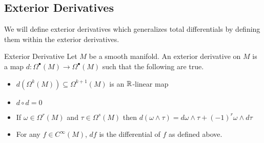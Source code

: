 \documentclass[a4paper]{article}
\begin{document}
\subsection{Exterior Derivatives}
We will define exterior derivatives which generalizes total differentials by defining them within the exterior derivatives. 

\begin{defn}{Exterior Derivative}{} Let $M$ be a smooth manifold. An exterior derivative on $M$ is a map $d:\Omega^\bullet(M)\to\Omega^\bullet(M)$ such that the following are true. 
\begin{itemize}
\item $d(\Omega^k(M))\subseteq\Omega^{k+1}(M)$ is an $\mathbb{R}$-linear map
\item $d\circ d=0$
\item If $\omega\in\Omega^r(M)$ and $\tau\in\Omega^s(M)$ then $d(\omega\wedge\tau)=d\omega\wedge\tau+(-1)^r\omega\wedge d\tau$
\item For any $f\in C^\infty(M)$, $df$ is the differential of $f$ as defined above. 
\end{itemize}
\end{defn}
\end{document}
